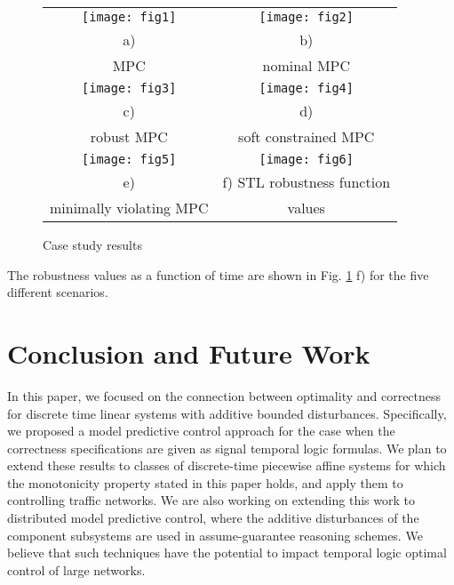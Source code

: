 \documentclass[letterpaper, 10 pt, conference]{ieeeconf}
\begin{document}
\begin{figure}[t]
\begin{center}
\begin{tabular}{@{}c@{}@{}c@{}}

            \texttt{[image: fig1]} &  \texttt{[image: fig2]}
                        \\
                                          a)  & b)  \\
                                                                                    MPC & nominal MPC
                        \\
                      \texttt{[image: fig3]} &    \texttt{[image: fig4]} 
                        \\
                        c)   & d) 
                        \\
                        robust MPC & soft constrained MPC
                        \\
                                              \texttt{[image: fig5]} &    \texttt{[image: fig6]}
                        \\
                        e)   & f) STL robustness function
                        \\
                        minimally violating MPC & values
                        
        \end{tabular}
\caption{Case study results}
\label{fig:case}
\end{center}
\end{figure}

The robustness values as a function of time are shown in Fig. \ref{fig:case} f) for the five different scenarios. 


\section{Conclusion and Future Work}


In this paper, we focused on the connection between optimality and correctness for discrete time linear systems with additive bounded disturbances. Specifically, we proposed a model predictive control approach for the case when the correctness specifications are given as signal temporal logic formulas. We plan to extend these results to classes of discrete-time piecewise affine systems for which the monotonicity property stated in this paper holds, and apply them to controlling traffic networks. We are also working on extending this work to distributed model predictive control, where the additive disturbances of the component subsystems are used in assume-guarantee reasoning schemes. We believe that such techniques have the potential to impact temporal logic optimal control of large networks.


\end{document}
